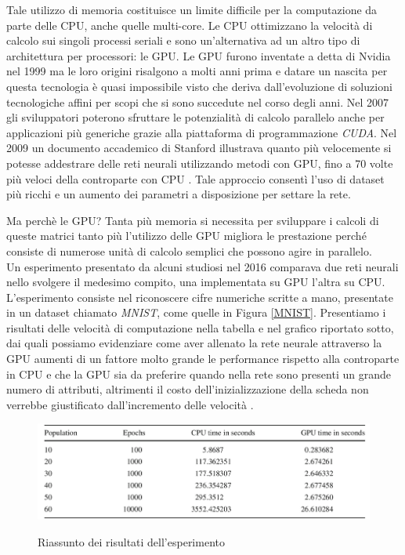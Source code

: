 Tale utilizzo di memoria costituisce un limite difficile per la computazione da parte delle CPU, anche quelle multi-core. Le CPU ottimizzano la velocità di calcolo sui singoli processi seriali e sono un'alternativa ad un altro tipo di architettura per processori: le GPU. Le GPU furono inventate a detta di Nvidia nel 1999 ma le loro origini risalgono a molti anni prima e datare un nascita per questa tecnologia è quasi impossibile visto che deriva dall'evoluzione di soluzioni tecnologiche affini per scopi che si sono succedute nel corso degli anni. Nel 2007 gli sviluppatori poterono sfruttare le potenzialità di calcolo parallelo anche per applicazioni più generiche grazie alla piattaforma di programmazione \textit{CUDA}. Nel 2009 un documento accademico di Stanford illustrava quanto più velocemente si potesse addestrare delle reti neurali utilizzando metodi con GPU, fino a 70 volte più veloci della controparte con CPU \cite{raina2009large}. Tale approccio consentì l'uso di dataset più ricchi e un aumento dei parametri a disposizione per settare la rete. 

Ma perchè le GPU? Tanta più memoria si necessita per sviluppare i calcoli di queste matrici tanto più l'utilizzo delle GPU migliora le prestazione perché consiste di numerose unità di calcolo semplici che possono agire in parallelo.
\\
Un esperimento presentato da alcuni studiosi nel 2016 comparava due reti neurali nello svolgere il medesimo compito, una implementata su GPU l'altra su CPU. L'esperimento consiste nel riconoscere cifre numeriche scritte a mano, presentate in un dataset chiamato \textit{MNIST}, come quelle in Figura \ref{MNIST}. Presentiamo i risultati delle velocità di computazione nella tabella e nel grafico riportato sotto, dai quali possiamo evidenziare come aver allenato la rete neurale attraverso la GPU aumenti di un fattore molto grande le performance rispetto alla controparte in CPU e che la GPU sia da preferire quando nella rete sono presenti un grande numero di attributi, altrimenti il costo dell'inizializzazione della scheda non verrebbe giustificato dall'incremento delle velocità \cite{brito2016gpu}.

\vspace{15mm}

\begin{figure}[h]
\centering
{\includegraphics[scale=0.65]{media_tesi/table_experiment.png}}
\caption{Riassunto dei risultati dell'esperimento \cite{brito2016gpu}}
\label{fig:subfig}
\end{figure}

